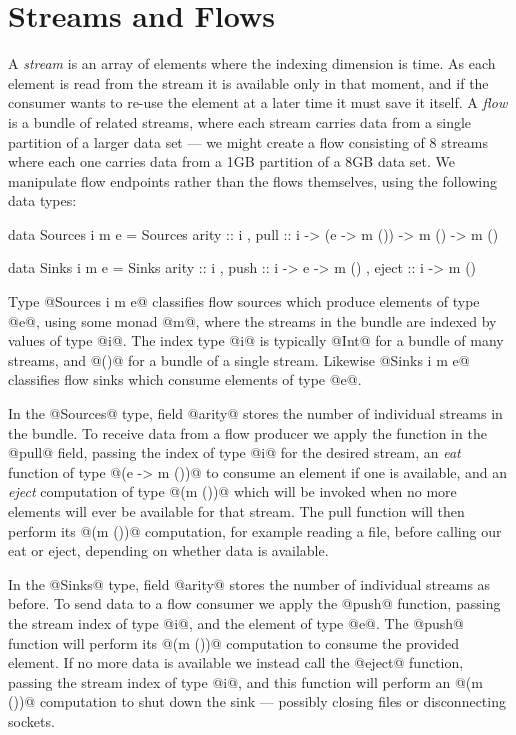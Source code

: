 
\section{Streams and Flows}
\label{s:Streams}
A \emph{stream} is an array of elements where the indexing dimension is time. As each element is read from the stream it is available only in that moment, and if the consumer wants to re-use the element at a later time it must save it itself. A \emph{flow} is a bundle of related streams, where each stream carries data from a single partition of a larger data set --- we might create a flow consisting of 8 streams where each one carries data from a 1GB partition of a 8GB data set. We manipulate flow endpoints rather than the flows themselves, using the following data types:

\begin{code}
data Sources i m e 
   = Sources
   { arity :: i
   , pull  :: i -> (e -> m ()) -> m () -> m () }

data Sinks   i m e 
   = Sinks   
   { arity :: i
   , push  :: i -> e -> m ()
   , eject :: i -> m () }
\end{code}

Type @Sources i m e@ classifies flow sources which produce elements of type @e@, using some monad @m@, where the streams in the bundle are indexed by values of type @i@. The index type @i@ is typically @Int@ for a bundle of many streams, and @()@ for a bundle of a single stream. Likewise @Sinks i m e@ classifies flow sinks which consume elements of type @e@.

In the @Sources@ type, field @arity@ stores the number of individual streams in the bundle. To receive data from a flow producer we apply the function in the @pull@ field, passing the index of type @i@ for the desired stream, an \emph{eat} function of type @(e -> m ())@ to consume an element if one is available, and an \emph{eject} computation of type @(m ())@ which will be invoked when no more elements will ever be available for that stream. The pull function will then perform its @(m ())@ computation, for example reading a file, before calling our eat or eject, depending on whether data is available.

In the @Sinks@ type, field @arity@ stores the number of individual streams as before. To send data to a flow consumer we apply the @push@ function, passing the stream index of type @i@, and the element of type @e@. The @push@ function will perform its @(m ())@ computation to consume the provided element. If no more data is available we instead call the @eject@ function, passing the stream index of type @i@, and this function will perform an @(m ())@ computation to shut down the sink --- possibly closing files or disconnecting sockets.

